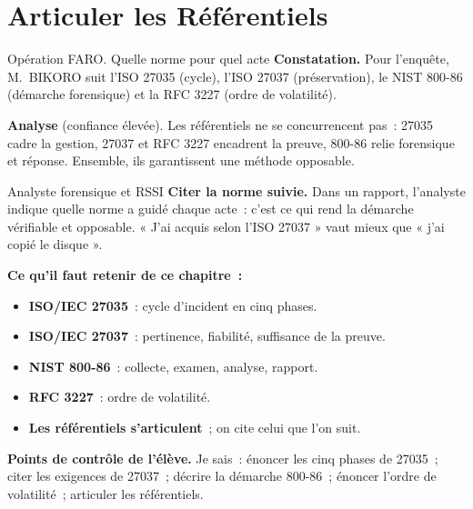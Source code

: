 \section{Articuler les Référentiels}
\label{sec:c08-articuler}

\begin{boxscenario}{Opération FARO. Quelle norme pour quel acte}
\textbf{Constatation.} Pour l'enquête, M.~BIKORO suit l'ISO 27035 (cycle),
l'ISO 27037 (préservation), le NIST 800-86 (démarche forensique) et la
RFC 3227 (ordre de volatilité).

\medskip
\textbf{Analyse} (confiance élevée). Les référentiels ne se concurrencent
pas~: 27035 cadre la gestion, 27037 et RFC 3227 encadrent la preuve, 800-86
relie forensique et réponse. Ensemble, ils garantissent une méthode
opposable.
\end{boxscenario}

\begin{boxmetier}{Analyste forensique et RSSI}
\textbf{Citer la norme suivie.} Dans un rapport, l'analyste indique quelle
norme a guidé chaque acte~: c'est ce qui rend la démarche vérifiable et
opposable. « J'ai acquis selon l'ISO 27037 » vaut mieux que « j'ai copié le
disque ».
\end{boxmetier}

\separateur

\begin{boxresume}
\textbf{Ce qu'il faut retenir de ce chapitre~:}
\begin{itemize}
    \item \textbf{ISO/IEC 27035}~: cycle d'incident en cinq phases.
    \item \textbf{ISO/IEC 27037}~: pertinence, fiabilité, suffisance de la
          preuve.
    \item \textbf{NIST 800-86}~: collecte, examen, analyse, rapport.
    \item \textbf{RFC 3227}~: ordre de volatilité.
    \item \textbf{Les référentiels s'articulent}~; on cite celui que l'on
          suit.
\end{itemize}
\end{boxresume}

\begin{boxinfo}
\textbf{Points de contrôle de l'élève.} Je sais~: énoncer les cinq phases de
27035~; citer les exigences de 27037~; décrire la démarche 800-86~; énoncer
l'ordre de volatilité~; articuler les référentiels.
\end{boxinfo}

